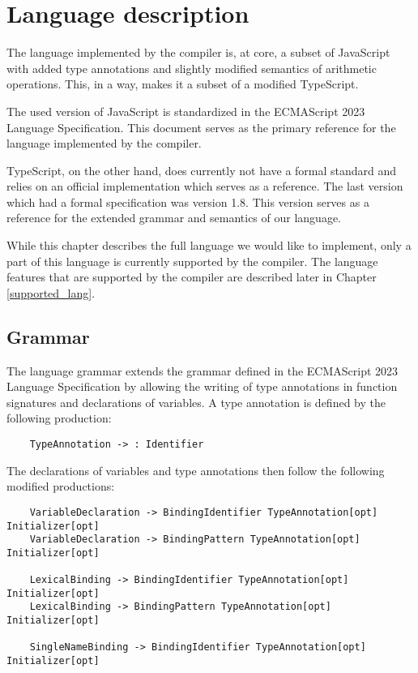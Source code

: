 \chapter{Language description}\label{language}

The language implemented by the compiler is, at core, a subset of JavaScript with added type annotations and slightly modified semantics of arithmetic operations. This, in a way, makes it a subset of a modified TypeScript.

The used version of JavaScript is standardized in the ECMAScript 2023 Language Specification\cite{ecma262}. This document serves as the primary reference for the language implemented by the compiler.

TypeScript, on the other hand, does currently not have a formal standard and relies on an official implementation which serves as a reference. The last version which had a formal specification was version 1.8\cite{typescript18}. This version serves as a reference for the extended grammar and semantics of our language.

While this chapter describes the full language we would like to implement, only a part of this language is currently supported by the compiler. The language features that are supported by the compiler are described later in Chapter \ref{supported_lang}.

\section{Grammar}\label{grammar}

The language grammar extends the grammar defined in the ECMAScript 2023 Language Specification\cite{ecma262} by allowing the writing of type annotations in function signatures and declarations of variables. A type annotation is defined by the following production:

\begin{verbatim}
    TypeAnnotation -> : Identifier
\end{verbatim}


The declarations of variables and type annotations then follow the following modified productions:
\begin{verbatim}
    VariableDeclaration -> BindingIdentifier TypeAnnotation[opt] Initializer[opt]
    VariableDeclaration -> BindingPattern TypeAnnotation[opt] Initializer[opt]

    LexicalBinding -> BindingIdentifier TypeAnnotation[opt] Initializer[opt]
    LexicalBinding -> BindingPattern TypeAnnotation[opt] Initializer[opt]

    SingleNameBinding -> BindingIdentifier TypeAnnotation[opt] Initializer[opt]
\end{verbatim}

